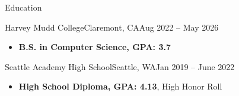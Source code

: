 \documentclass[]{mcdowellcv}
\begin{document}
\makeheader


\begin{cvsection}{Education}
	\begin{cvsubsection}{Harvey Mudd College}{Claremont, CA}{Aug 2022 -- May 2026}
		\begin{itemize}
			\item \textbf{B.S. in Computer Science, GPA: 3.7}
		\end{itemize}
	\end{cvsubsection}
	\begin{cvsubsection}{Seattle Academy High School}{Seattle, WA}{Jan 2019 -- June 2022}
		\begin{itemize}
			\item \textbf{High School Diploma, GPA: 4.13}, High Honor Roll
		\end{itemize}
	\end{cvsubsection}
\end{cvsection}
\end{document}
